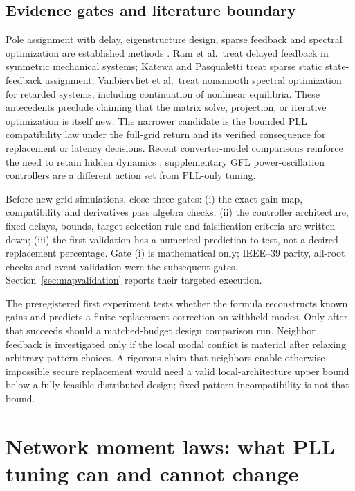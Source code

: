 \documentclass[11pt]{article}
\begin{document}
\subsection{Evidence gates and literature boundary}
Pole assignment with delay, eigenstructure design, sparse feedback and
spectral optimization are established methods
\cite{ram,katewa,vanbiervliet,mao}.
Ram et al.\ treat delayed feedback in symmetric mechanical systems;
Katewa and Pasqualetti treat sparse static state-feedback assignment;
Vanbiervliet et al.\ treat nonsmooth spectral optimization for retarded
systems, including continuation of nonlinear equilibria.
These antecedents preclude claiming that the matrix solve, projection,
or iterative optimization is itself new. The narrower candidate is
the bounded PLL compatibility law under the full-grid return and its
verified consequence for replacement or latency decisions.
Recent converter-model comparisons reinforce the need to retain
hidden dynamics \cite{coffey}; supplementary GFL power-oscillation
controllers \cite{chakraborty} are a different action set from PLL-only tuning.

Before new grid simulations, close three gates:
(i) the exact gain map, compatibility and derivatives pass algebra checks;
(ii) the controller architecture, fixed delays, bounds, target-selection
rule and falsification criteria are written down;
(iii) the first validation has a numerical prediction to test, not a
desired replacement percentage. Gate (i) is mathematical only; IEEE--39
parity, all-root checks and event validation were the subsequent gates.
Section~\ref{sec:mapvalidation} reports their targeted execution.

The preregistered first experiment tests whether the formula reconstructs known
gains and predicts a finite replacement correction on withheld modes.
Only after that succeeds should a matched-budget design comparison run.
Neighbor feedback is investigated only if the local modal conflict is
material after relaxing arbitrary pattern choices. A rigorous claim
that neighbors enable otherwise impossible secure replacement would
need a valid local-architecture upper bound below a fully feasible
distributed design; fixed-pattern incompatibility is not that bound.


\section{Network moment laws: what PLL tuning can and cannot change}
\label{sec:networkmoments}
\end{document}
